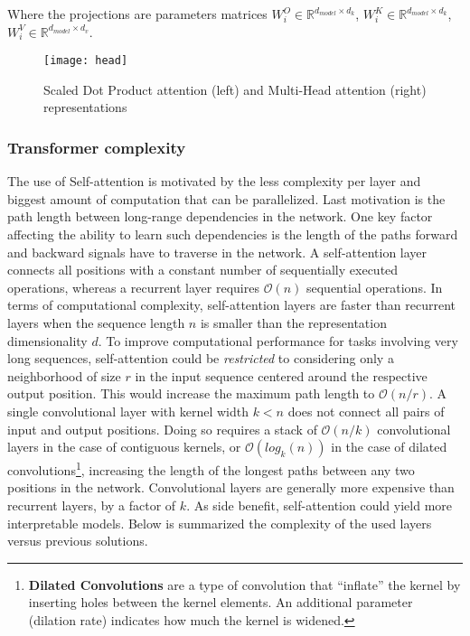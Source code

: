 \documentclass[11pt]{article}
\newcommand\R{\ensuremath{\mathbb{R}}}
\begin{document}
\noindent Where the projections are parameters matrices $W_i^O \in \R^{d_{model} \times d_k}$, $W^K_i \in \R^{d_{model} \times d_k}$, $W_i^V \in \R^{d_{model} \times d_v}$.


\begin{figure}[h]
\centerline{\texttt{[image: head]}}
\caption{Scaled Dot Product attention (left) and Multi-Head attention (right) representations} 
\label{fig}
\end{figure}

\subsubsection{Transformer complexity}
The use of Self-attention is motivated by the less complexity per layer and biggest amount of computation that can be parallelized. Last motivation is the path length between long-range dependencies in the network. One key factor affecting the ability to learn such dependencies is the length of the paths forward and backward signals have to traverse in the network. A self-attention layer connects all positions with a constant number of sequentially executed operations, whereas a recurrent layer requires $\mathcal{O}(n)$ sequential operations. In terms of computational complexity, self-attention layers are faster than recurrent layers when the sequence length $n$ is smaller than the representation dimensionality $d$. To improve computational performance for tasks involving very long sequences, self-attention could be \emph{restricted} to considering only a neighborhood of size $r$ in the input sequence centered around the respective output position. This would increase the maximum path length to $\mathcal{O}(n/r)$.  A single convolutional layer with kernel width $k < n$ does not connect all pairs of input and output positions. Doing so requires a stack of $\mathcal{O}(n/k)$ convolutional layers in the case of contiguous kernels, or $\mathcal{O}(log_k (n))$ in the case of dilated convolutions\footnote{\textbf{Dilated Convolutions} are a type of convolution that “inflate” the kernel by inserting holes between the kernel elements. An additional parameter  (dilation rate) indicates how much the kernel is widened.}, increasing the length of the longest paths between any two positions in the network. Convolutional layers are generally more expensive than recurrent layers, by a factor of $k$. As side benefit, self-attention could yield more interpretable models. Below is summarized the complexity of the used layers versus previous solutions.
\end{document}
